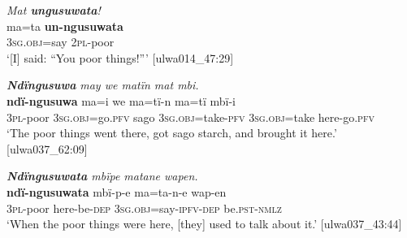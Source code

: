 \ea%
    \label{ex:pron:105}
          \textit{Mat \textbf{ungusuwata}!}\\
\gll    ma=ta      \textbf{un-ngusuwata}\\
    3\textsc{sg.obj}=say  2\textsc{pl{}-}poor\\
\glt `[I] said: “You poor things!”’ [ulwa014\_47:29]
\z

\ea%
    \label{ex:pron:106}
          \textbf{\textit{Ndïngusuwa}} \textit{may we matïn mat mbi.}\\
\gll    \textbf{ndï-ngusuwa}  ma=i         we    ma=tï-n ma=tï      mbï-i\\
    3\textsc{pl-}poor    3\textsc{sg.obj}=go.\textsc{pfv}  sago  3\textsc{sg.obj}=take-\textsc{pfv}    3\textsc{sg.obj}=take  here-go.\textsc{pfv}\\
\glt `The poor things went there, got sago starch, and brought it here.’ [ulwa037\_62:09]
\z

\ea%
    \label{ex:pron:107}
          \textit{\textbf{Ndïngusuwata} mbïpe matane wapen.}\\
\gll    \textbf{ndï-ngusuwata}  mbï-p-e    ma=ta-n-e wap-en\\
    3\textsc{pl-}poor      here-be\textsc{{}-dep} 3\textsc{sg.obj}=say-\textsc{ipfv-dep}    be.\textsc{pst-nmlz}\\
\glt `When the poor things were here, [they] used to talk about it.’ [ulwa037\_43:44]
\z


